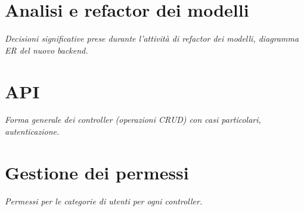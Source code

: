 \section{Analisi e refactor dei modelli}
\emph{Decisioni significative prese durante l'attività di refactor dei modelli, diagramma ER del nuovo backend.}

\section{API}
\emph{Forma generale dei controller (operazioni CRUD) con casi particolari, autenticazione.}

\section{Gestione dei permessi}
\emph{Permessi per le categorie di utenti per ogni controller.}
